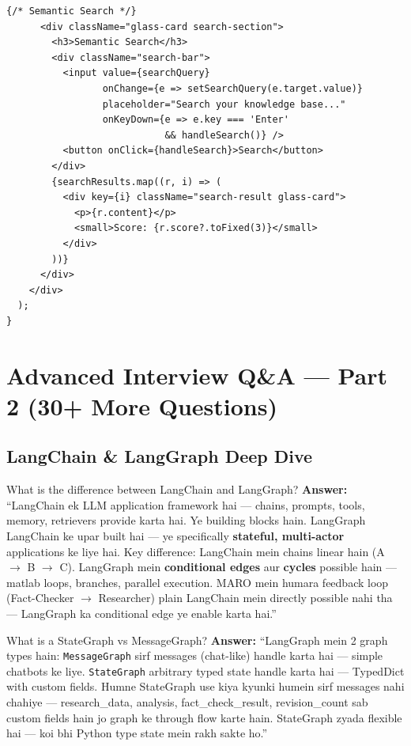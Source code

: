\documentclass[11pt,a4paper,twoside]{report}
\begin{document}
\begin{lstlisting}[style=jsstyle,caption={RAGHubView.jsx --- Document Upload + Search}]
      {/* Semantic Search */}
      <div className="glass-card search-section">
        <h3>Semantic Search</h3>
        <div className="search-bar">
          <input value={searchQuery}
                 onChange={e => setSearchQuery(e.target.value)}
                 placeholder="Search your knowledge base..."
                 onKeyDown={e => e.key === 'Enter'
                            && handleSearch()} />
          <button onClick={handleSearch}>Search</button>
        </div>
        {searchResults.map((r, i) => (
          <div key={i} className="search-result glass-card">
            <p>{r.content}</p>
            <small>Score: {r.score?.toFixed(3)}</small>
          </div>
        ))}
      </div>
    </div>
  );
}
\end{lstlisting}



\chapter{Advanced Interview Q\&A --- Part 2 (30+ More Questions)}

\section{LangChain \& LangGraph Deep Dive}

\begin{interviewbox}{What is the difference between LangChain and LangGraph?}
\textbf{Answer:} ``LangChain ek LLM application framework hai --- chains, prompts, tools, memory, retrievers provide karta hai. Ye building blocks hain. LangGraph LangChain ke upar built hai --- ye specifically \textbf{stateful, multi-actor} applications ke liye hai. Key difference: LangChain mein chains linear hain (A $\rightarrow$ B $\rightarrow$ C). LangGraph mein \textbf{conditional edges} aur \textbf{cycles} possible hain --- matlab loops, branches, parallel execution. MARO mein humara feedback loop (Fact-Checker $\rightarrow$ Researcher) plain LangChain mein directly possible nahi tha --- LangGraph ka conditional edge ye enable karta hai.''
\end{interviewbox}

\begin{interviewbox}{What is a StateGraph vs MessageGraph?}
\textbf{Answer:} ``LangGraph mein 2 graph types hain: \texttt{MessageGraph} sirf messages (chat-like) handle karta hai --- simple chatbots ke liye. \texttt{StateGraph} arbitrary typed state handle karta hai --- TypedDict with custom fields. Humne StateGraph use kiya kyunki humein sirf messages nahi chahiye --- research\_data, analysis, fact\_check\_result, revision\_count sab custom fields hain jo graph ke through flow karte hain. StateGraph zyada flexible hai --- koi bhi Python type state mein rakh sakte ho.''
\end{interviewbox}
\end{document}
